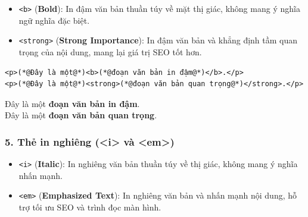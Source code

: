 \documentclass[11pt,oneside]{book}
\newcommand{\codeinline}[1]{\textcolor{accentOrange}{\texttt{#1}}}
\begin{document}
\begin{itemize}[leftmargin=1.8em, itemsep=3pt, parsep=0pt]
    \item \codeinline{<b>} (\textbf{Bold}): In đậm văn bản thuần túy về mặt thị giác, không mang ý nghĩa ngữ nghĩa đặc biệt.
    \item \codeinline{<strong>} (\textbf{Strong Importance}): In đậm văn bản và khẳng định tầm quan trọng của nội dung, mang lại giá trị SEO tốt hơn.
\end{itemize}

\begin{codeWindow}
\begin{lstlisting}[language=HTML5]
<p>(*@Đây là một@*)<b>(*@đoạn văn bản in đậm@*)</b>.</p>
<p>(*@Đây là một@*)<strong>(*@đoạn văn bản quan trọng@*)</strong>.</p>
\end{lstlisting}
\end{codeWindow}
\begin{tcolorbox}[
    enhanced,
    colback=white,
    colframe=primaryBlue!20,
    arc=6pt,
    boxrule=0.8pt,
    drop shadow=black!3!white,
    top=8pt, bottom=8pt, left=12pt, right=12pt,
    title={\sffamily\bfseries\scriptsize\color{codeComment} KẾT QUẢ HIỂN THỊ TRÊN TRÌNH DUYỆT (BROWSER PREVIEW)},
    coltitle=codeComment,
    colbacktitle=codeBg!80!white
]
Đây là một \textbf{đoạn văn bản in đậm}.\\[3pt]
Đây là một \textbf{đoạn văn bản quan trọng}.
\end{tcolorbox}


\subsubsection{5. Thẻ in nghiêng (<i> và <em>)}

\begin{itemize}[leftmargin=1.8em, itemsep=3pt, parsep=0pt]
    \item \codeinline{<i>} (\textbf{Italic}): In nghiêng văn bản thuần túy về thị giác, không mang ý nghĩa nhấn mạnh.
    \item \codeinline{<em>} (\textbf{Emphasized Text}): In nghiêng văn bản và nhấn mạnh nội dung, hỗ trợ tối ưu SEO và trình đọc màn hình.
\end{itemize}
\end{document}
